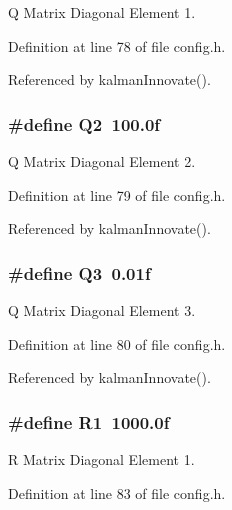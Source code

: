 Q Matrix Diagonal Element 1. 



Definition at line 78 of file config.\-h.



Referenced by kalman\-Innovate().

\hypertarget{group__config_gaf5bca4c32f8c6886a3d8c526d2e3e9a7}{
\subsubsection[{Q2}]{\setlength{\rightskip}{0pt plus 5cm}\#define Q2~100.\-0f}}\label{group__config_gaf5bca4c32f8c6886a3d8c526d2e3e9a7}


Q Matrix Diagonal Element 2. 



Definition at line 79 of file config.\-h.



Referenced by kalman\-Innovate().

\hypertarget{group__config_ga1d7d3dfd2c4618949c484c5e8369f05a}{
\subsubsection[{Q3}]{\setlength{\rightskip}{0pt plus 5cm}\#define Q3~0.\-01f}}\label{group__config_ga1d7d3dfd2c4618949c484c5e8369f05a}


Q Matrix Diagonal Element 3. 



Definition at line 80 of file config.\-h.



Referenced by kalman\-Innovate().

\hypertarget{group__config_ga918f64eb53db8e8dc694f36a87646476}{
\subsubsection[{R1}]{\setlength{\rightskip}{0pt plus 5cm}\#define R1~1000.\-0f}}\label{group__config_ga918f64eb53db8e8dc694f36a87646476}


R Matrix Diagonal Element 1. 



Definition at line 83 of file config.\-h.



